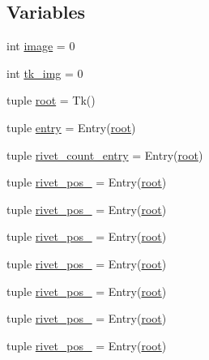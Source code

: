 \subsection*{Variables}
\begin{DoxyCompactItemize}
\item 
int \hyperlink{namespaceimage__saver_a25e7abc664db4dde2d3137041089be3e}{image} = 0
\item 
int \hyperlink{namespaceimage__saver_a459995215edd97f11e591dcb05c730b6}{tk\-\_\-img} = 0
\item 
tuple \hyperlink{namespaceimage__saver_ad3ff546e0704a9b9c8c8488020384e57}{root} = Tk()
\item 
tuple \hyperlink{namespaceimage__saver_a685d86e45440b51eff13e4a2990bea3e}{entry} = Entry(\hyperlink{namespaceimage__saver_ad3ff546e0704a9b9c8c8488020384e57}{root})
\item 
tuple \hyperlink{namespaceimage__saver_ad3f19d6ef5135a1be77b761700b14067}{rivet\-\_\-count\-\_\-entry} = Entry(\hyperlink{namespaceimage__saver_ad3ff546e0704a9b9c8c8488020384e57}{root})
\item 
tuple \hyperlink{namespaceimage__saver_a6f74aa1e9b6267ff3a26c4a7be24cb19}{rivet\-\_\-pos\-\_} = Entry(\hyperlink{namespaceimage__saver_ad3ff546e0704a9b9c8c8488020384e57}{root})
\item 
tuple \hyperlink{namespaceimage__saver_a5b59a8a224c914aa125ffe7b1c287ece}{rivet\-\_\-pos\-\_} = Entry(\hyperlink{namespaceimage__saver_ad3ff546e0704a9b9c8c8488020384e57}{root})
\item 
tuple \hyperlink{namespaceimage__saver_a047f449378930fbcf1cdae7ab437a4d3}{rivet\-\_\-pos\-\_} = Entry(\hyperlink{namespaceimage__saver_ad3ff546e0704a9b9c8c8488020384e57}{root})
\item 
tuple \hyperlink{namespaceimage__saver_a20913ce735ba9a45a6d4d44d3f89054d}{rivet\-\_\-pos\-\_} = Entry(\hyperlink{namespaceimage__saver_ad3ff546e0704a9b9c8c8488020384e57}{root})
\item 
tuple \hyperlink{namespaceimage__saver_ab29ac99683f94399fde492c92f49f241}{rivet\-\_\-pos\-\_} = Entry(\hyperlink{namespaceimage__saver_ad3ff546e0704a9b9c8c8488020384e57}{root})
\item 
tuple \hyperlink{namespaceimage__saver_a89a8b21048af3522c4f791369c9df8d1}{rivet\-\_\-pos\-\_} = Entry(\hyperlink{namespaceimage__saver_ad3ff546e0704a9b9c8c8488020384e57}{root})
\item 
tuple \hyperlink{namespaceimage__saver_a896197c10ccb574bbdfeeb7ae762503f}{rivet\-\_\-pos\-\_} = Entry(\hyperlink{namespaceimage__saver_ad3ff546e0704a9b9c8c8488020384e57}{root})

\end{DoxyCompactItemize}
